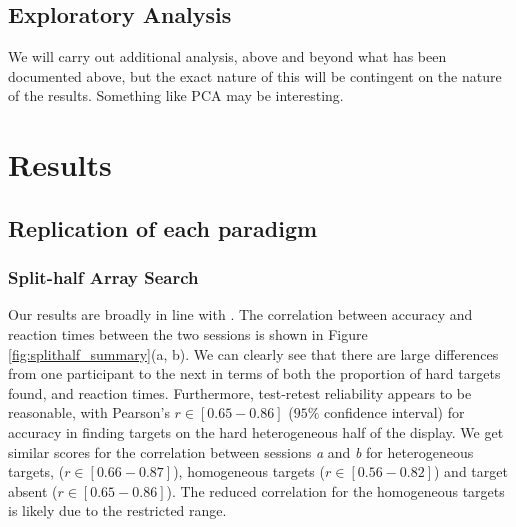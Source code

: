 \documentclass[]{rsos}%
\begin{document}
\subsection{Exploratory Analysis}

We will carry out additional analysis, above and beyond what has been documented above, but the exact nature of this will be contingent on the nature of the results. Something like PCA may be interesting. 

\section{Results}

\subsection{Replication of each paradigm}

\subsubsection{Split-half Array Search}
Our results are broadly in line with \cite{nowakowsak2017}. The correlation between accuracy and reaction times between the two sessions is shown in Figure \ref{fig:splithalf_summary}(a, b). We can clearly see that there are large differences from one participant to the next in terms of both the proportion of hard targets found, and reaction times. Furthermore, test-retest reliability appears to be reasonable, with Pearson's $r \in [0.65-0.86]$ ($95\%$ confidence interval) for accuracy in finding targets on the hard heterogeneous half of the display. We get similar scores for the correlation between sessions \textit{a} and \textit{b} for heterogeneous targets, ($r \in [0.66-0.87]$), homogeneous targets ($r \in [0.56-0.82]$) and target absent ($r \in [0.65-0.86]$). The reduced correlation for the homogeneous targets is likely due to the restricted range.
\end{document}
